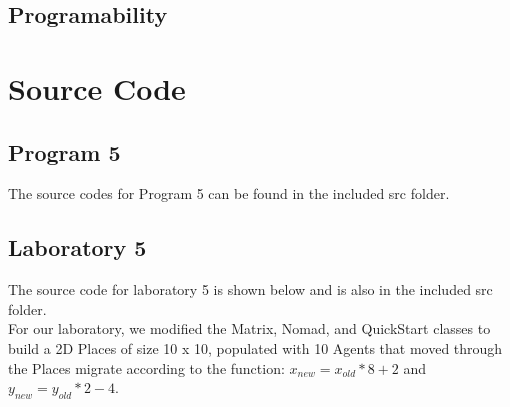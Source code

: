 \documentclass{article}
\begin{document}
		\subsection{Programability} \label{PROG}


\pagebreak
	
	\section{Source Code} \label{SRC}
		\subsection{Program 5} \label{P5_SRC}
		The source codes for Program 5 can be found in the included src folder.\\
	
	
		\subsection{Laboratory 5} \label{L5_SRC}
			The source code for laboratory 5 is shown below and is also in the included src folder.\\
			For our laboratory, we modified the Matrix, Nomad, and QuickStart classes to build a 2D Places of size 10 x 10, populated with 10 Agents that moved through the Places migrate according to the function: $x_{new} = x_{old} * 8 + 2$ and $y_{new} = y_{old} * 2 - 4$.
\end{document}
